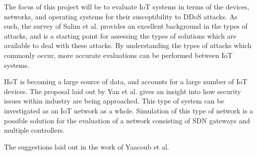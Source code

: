 The focus of this project will be to evaluate IoT systems in terms of the
devices, networks, and operating systems for their susceptibility to DDoS
attacks. As such, the survey of Salim et al.\cite{Salim2019} provides an
excellent background in the types of attacks, and is a starting point for
assessing the types of solutions which are available to deal with these attacks.
By understanding the types of attacks which commonly occur, more accurate
evaluations can be performed between IoT systems.

IIoT is becoming a large source of data, and accounts for a large number of IoT
devices. The proposal laid out by Yan et al.\cite{iiot_2019} gives an insight
into how security issues within industry are being approached. This type of
system can be investigated as an IoT network as a whole. Simulation of this type
of network is a possible solution for the evaluation of a network consisting of
SDN gateways and multiple controllers.

The suggestions laid out in the work of Yaacoub et al.\cite{iomt_2019}
